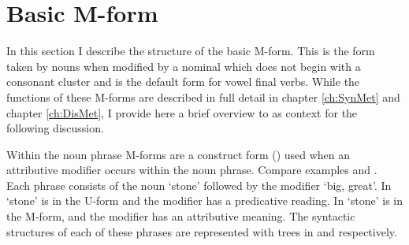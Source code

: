 \section{Basic M-form}\label{sec:BasMfo}
In this section I describe the structure of the basic M-form.
This is the form taken by nouns when modified by a nominal
which does not begin with a consonant cluster
and is the default form for vowel final verbs.
While the functions of these M-forms are described
in full detail in chapter \ref{ch:SynMet} and chapter \ref{ch:DisMet},
I provide here a brief overview to as context for the following discussion.

Within the noun phrase M-forms are a construct form ()
used when an attributive modifier occurs within the noun phrase.
Compare examples  and .
Each phrase consists of the noun  {\tl}  `stone'
followed by the modifier  `big, great'.
In   `stone' is in the U-form
and the modifier has a predicative reading.
In   `stone' is in the M-form,
and the modifier has an attributive meaning.
The syntactic structures of each of these phrases
are represented with trees in  and  respectively.

\begin{multicols}{2}
	\begin{exe}
		\label{ex:StoAreBig}
		\label{ex:BigSto}
	\end{exe}
\end{multicols}

\begin{multicols}{2}
	\begin{exe}
		\label{tr:StoAreBig}
		\label{tr:BigSto}
	\end{exe}
\end{multicols}

